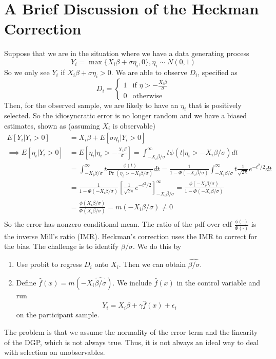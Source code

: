 \section{A Brief Discussion of the Heckman Correction}
Suppose that we are in the situation where we have a data generating process
\[
Y_i = \max\{X_i\beta+\sigma\eta_i, 0\}, \eta_i \sim N(0,1)
\]
So we only see $Y_i$ if $X_i\beta+\sigma\eta_i>0$. We are able to observe $D_i$, specified as
\[
D_i=\begin{cases}1 & \text{if }\eta>-\frac{X_i\beta}{\sigma}\\ 0 & \text{otherwise} \end{cases}
\]
Then, for the observed sample, we are likely to have an $\eta_i$ that is positively selected. So the idiosyncratic error is no longer random and we have a biased estimates, shown as (assuming $X_i$ is observable)
\footnotesize{\begin{align*}
E[Y_i|Y_i>0]&= X_i\beta + E[\sigma\eta_i|Y_i>0]\\
\implies E[\eta_i|Y_i>0]& =E\left[\eta_i| \eta_i>-\frac{X_i\beta}{\sigma}\right]=\int_{-X_i\beta/\sigma}^\infty t\phi(t|\eta_i>-X_i\beta/\sigma)dt\\
&=\int_{-X_i\beta/\sigma}^\infty t\frac{\phi(t)}{\Pr(\eta_i>-X_i\beta/\sigma)}dt =\frac{1}{1-\Phi(-X_i\beta/\sigma)}\int_{-X_i\beta/\sigma}^\infty t\frac{1}{\sqrt{2\pi}}e^{-t^2/2}dt\\
&=\frac{1}{1-\Phi(-X_i\beta/\sigma)}\left[\frac{1}{\sqrt{2\pi}}e^{-t^2/2}\right]_{-X_i\beta/\sigma}^\infty=\frac{\phi(-X_i\beta/\sigma)}{1-\Phi(-X_i\beta/\sigma)}\\
&=\frac{\phi(X_i\beta/\sigma)}{\Phi(X_i\beta/\sigma)}=m(-X_i\beta/\sigma)\neq0\\
\end{align*}}\normalsize
So the error has nonzero conditional mean. The ratio of the pdf over cdf $\frac{\phi(\cdot)}{\Phi(\cdot)}$ is the inverse Mill's ratio (IMR). Heckman's correction uses the IMR to correct for the bias. The challenge is to identify $\beta/\sigma$. We do this by
\begin{enumerate}
\item Use probit to regress $D_i$ onto $X_i$. Then we can obtain $\widehat{\beta/\sigma}$.
\item Define $\hat{f}(x)=m(-X_i\widehat{\beta/\sigma})$. We include $\hat{f}(x)$ in the control variable and run
\[
Y_i = X_i\beta+ \gamma\hat{f}(x)+\epsilon_i
\]
on the participant sample. 
\end{enumerate}\par
The problem is that we assume the normality of the error term and the linearity of the DGP, which is not always true. Thus, it is not always an ideal way to deal with selection on unobservables. 
